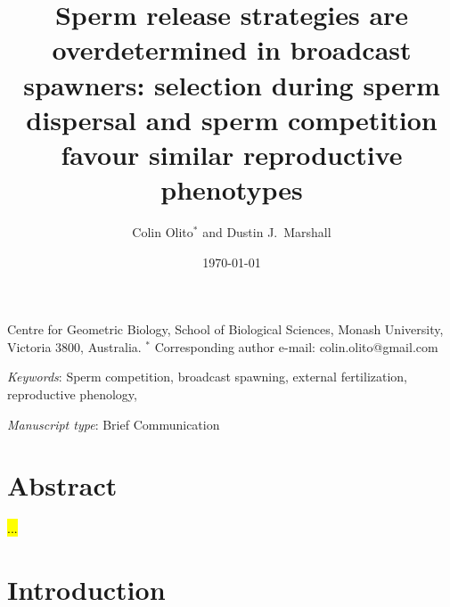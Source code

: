 \documentclass{article}
\title{Sperm release strategies are overdetermined in broadcast spawners: selection during sperm dispersal and sperm competition favour similar reproductive phenotypes}
\author{Colin Olito$^{\ast}$ and Dustin J.~Marshall}
\date{\today}
\begin{document}
\maketitle


\noindent{} Centre for Geometric Biology, School of Biological Sciences, Monash University, Victoria 3800, Australia.
\noindent{} $^\ast$ Corresponding author e-mail: colin.olito@gmail.com

\bigskip

\noindent{} \textit{Keywords}: Sperm competition, broadcast spawning, external fertilization, reproductive phenology, 

\bigskip

\noindent{} \textit{Manuscript type}: Brief Communication

\bigskip


\linenumbers
\modulolinenumbers[1]
\renewcommand\linenumberfont{\normalfont\small}


\newpage{}
\section*{Abstract}

\noindent{} \hl{...}

\section*{Introduction}

\end{document}
